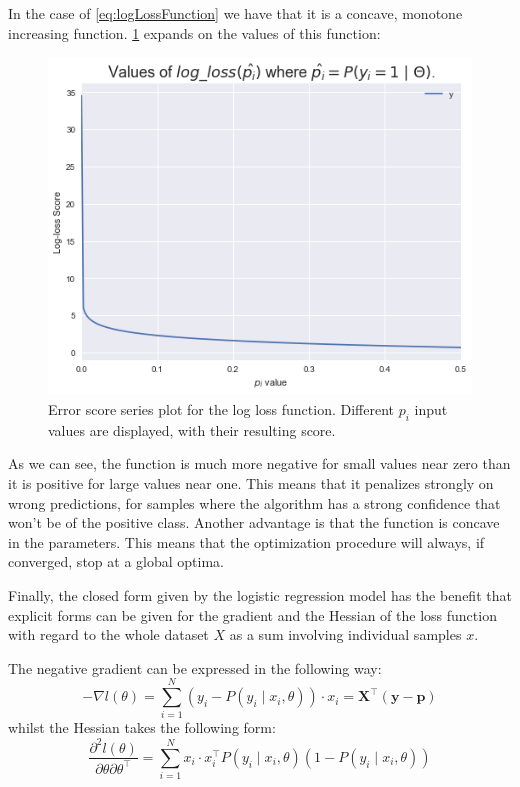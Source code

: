 In the case of \cref{eq:logLossFunction} we have that it is a concave, monotone increasing function.
\cref{figure-logLossValues} expands on the values of this function:

\begin{figure}[h!]
\begin{center}
\includegraphics[width=0.7\columnwidth]{figures/logloss/figure-logLossValues.png}
\caption{ Error score series plot for the log loss function.
Different $p_i$ input values are displayed, with their resulting score.}
\label{figure-logLossValues}
\end{center}
\end{figure}

As we can see, the function is much more negative for small values near zero than it is positive for large values near one.
This means that it penalizes strongly on wrong predictions, for samples where the algorithm has a strong confidence that won't be of the positive class.
Another advantage is that the function is concave in the parameters.
This means that the optimization procedure will always, if converged, stop at a global optima.

Finally, the closed form given by the logistic regression model has the benefit that explicit forms can be given for the gradient and the Hessian of the loss function with regard to the whole dataset $X$ as a sum involving individual samples $x$.

The negative gradient can be expressed in the following way: %
\begin{equation}\label{eq:logitHessian1}
- \nabla l(\theta) = \sum_{i=1}^N (y_i - P(y_i \mid x_i,\theta))\cdot x_i = \textbf{X}^{\intercal}(\textbf{y}-\textbf{p})
\end{equation}
whilst the Hessian takes the following form:
\begin{equation}\label{eq:logitHessian2}
\frac{\partial^2 l(\theta)}{\partial \theta \partial \theta^\intercal} = \sum_{i=1}^N x_i \cdot x_i^\intercal P(y_i \mid x_i,\theta)(1 -P(y_i \mid x_i,\theta))
\end{equation}

